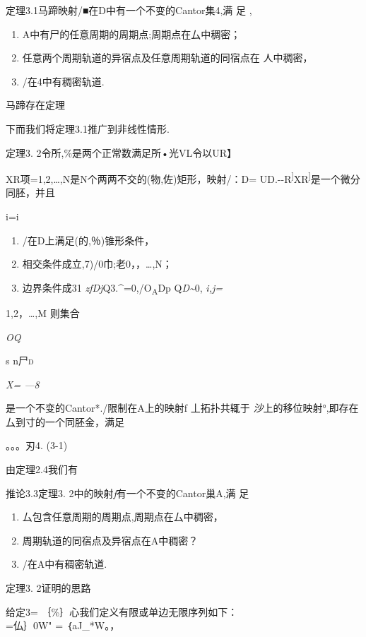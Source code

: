 \documentclass{article}
\begin{document}
定理3.1马蹄映射/■在D中有一个不变的Cantor集4,满 足 ,

\begin{enumerate}
\def\labelenumi{(\arabic{enumi})}
\item
  A中有尸的任意周期的周期点;周期点在厶中稠密；
\item
  任意两个周期轨道的异宿点及任意周期轨道的同宿点在 人中稠密，
\item
  /在4中有稠密轨道.
\end{enumerate}

马蹄存在定理

下而我们将定理3.1推广到非线性情形.

定理3. 2令所,\%是两个正常数满足所•光VL令以UR】

XR项=1,2,\ldots{},N是N个两两不交的(物,佐)矩形，映射/：D=
UD.-\/-R\textsuperscript{{]}}XR\textsuperscript{{]}}是一个微分同胚，并且

i=i

\begin{enumerate}
\def\labelenumi{(\arabic{enumi})}
\item
  /在D上满足(的,％)锥形条件，
\item
  相交条件成立,7)/0巾;老0，，\ldots{},N；
\item
  边界条件成31 \emph{zfDj}Q3.\^{}=0,/O\textsubscript{A}Dp
  Q\emph{D\textasciitilde{}}0, \emph{i,j=}
\end{enumerate}

1,2，\ldots{},M 则集合

\emph{OQ}

s n尸\textsc{d}

\emph{X= ---8}

是一个不变的Cantor*./限制在A上的映射f \textbar{}丄拓扑共辄于
\emph{沙}上的移位映射°,即存在厶到寸的一个同胚金，满足

。。。刃4. (3-1)

由定理2.4我们有

推论3.3定理3. 2中的映射\emph{f}有一个不变的Cantor巢A,满 足

\begin{enumerate}
\def\labelenumi{(\arabic{enumi})}
\item
  厶包含任意周期的周期点,周期点在厶中稠密，
\item
  周期轨道的同宿点及异宿点在A中稠密？
\item
  /在A中有稠密轨道.
\end{enumerate}

定理3. 2证明的思路

给定3= ｛\%｝心我们定义有限或单边无限序列如下：\\
=仏｝0W" = ｛aJ\_*W。，
\end{document}
